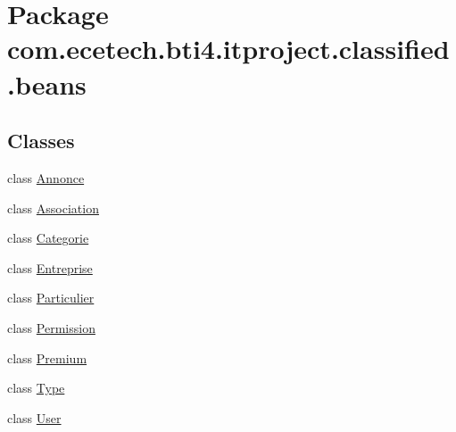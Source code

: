 \hypertarget{namespacecom_1_1ecetech_1_1bti4_1_1itproject_1_1classified_1_1beans}{}\section{Package com.\+ecetech.\+bti4.\+itproject.\+classified.\+beans}
\label{namespacecom_1_1ecetech_1_1bti4_1_1itproject_1_1classified_1_1beans}
\subsection*{Classes}
\begin{DoxyCompactItemize}
\item 
class \hyperlink{classcom_1_1ecetech_1_1bti4_1_1itproject_1_1classified_1_1beans_1_1_annonce}{Annonce}
\item 
class \hyperlink{classcom_1_1ecetech_1_1bti4_1_1itproject_1_1classified_1_1beans_1_1_association}{Association}
\item 
class \hyperlink{classcom_1_1ecetech_1_1bti4_1_1itproject_1_1classified_1_1beans_1_1_categorie}{Categorie}
\item 
class \hyperlink{classcom_1_1ecetech_1_1bti4_1_1itproject_1_1classified_1_1beans_1_1_entreprise}{Entreprise}
\item 
class \hyperlink{classcom_1_1ecetech_1_1bti4_1_1itproject_1_1classified_1_1beans_1_1_particulier}{Particulier}
\item 
class \hyperlink{classcom_1_1ecetech_1_1bti4_1_1itproject_1_1classified_1_1beans_1_1_permission}{Permission}
\item 
class \hyperlink{classcom_1_1ecetech_1_1bti4_1_1itproject_1_1classified_1_1beans_1_1_premium}{Premium}
\item 
class \hyperlink{classcom_1_1ecetech_1_1bti4_1_1itproject_1_1classified_1_1beans_1_1_type}{Type}
\item 
class \hyperlink{classcom_1_1ecetech_1_1bti4_1_1itproject_1_1classified_1_1beans_1_1_user}{User}
\end{DoxyCompactItemize}
